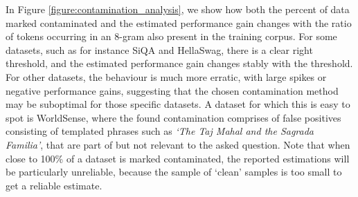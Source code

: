 In Figure \ref{figure:contamination_analysis}, we show how both the percent of data marked contaminated and the estimated performance gain changes with the ratio of tokens occurring in an 8-gram also present in the training corpus. 
For some datasets, such as for instance SiQA and HellaSwag, there is a clear right threshold, and the estimated performance gain changes stably with the threshold.
For other datasets, the behaviour is much more erratic, with large spikes or negative performance gains, suggesting that the chosen contamination method may be suboptimal for those specific datasets.
A dataset for which this is easy to spot is WorldSense, where the found contamination comprises of false positives consisting of templated phrases such as \emph{`The Taj Mahal and the Sagrada Familia'}, that are part of but not relevant to the asked question.
Note that when close to 100\% of a dataset is marked contaminated, the reported estimations will be particularly unreliable, because the sample of `clean' samples is too small to get a reliable estimate.

